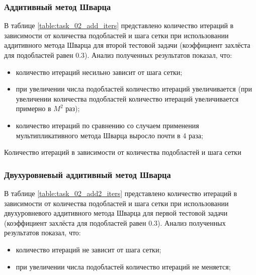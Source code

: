 \documentclass[a4paper]{article}
\begin{document}
\newpage

\subsubsection{Аддитивный метод Шварца}

В таблице \ref{table:task_02_add_iters} представлено количество итераций в зависимости от количества подобластей и шага сетки при использовании аддитивного метода Шварца для второй тестовой задачи (коэффициент захлёста для подобластей равен 0.3). Анализ полученных результатов показал, что:
\begin{itemize}
\item количество итераций несильно зависит от шага сетки;
\item при увеличении числа подобластей количество итераций увеличивается (при увеличении количества подобластей количество итераций увеличивается примерно в $M^2$ раз);
\item количество итераций по сравнению со случаем применения мультипликативного метода Шварца выросло почти в 4 раза;
\end{itemize}

\begin{table}[h]
\caption{Количество итераций в зависимости от количества подобластей и шага сетки}
\label{table:task_02_add_iters}
\end{table}

\newpage

\subsubsection{Двухуровневый аддитивный метод Шварца}

В таблице \ref{table:task_02_add2_iters} представлено количество итераций в зависимости от количества подобластей и шага сетки при использовании двухуровневого аддитивного метода Шварца для первой тестовой задачи (коэффициент захлёста для подобластей равен 0.3). Анализ полученных результатов показал, что:
\begin{itemize}
\item количество итераций не зависит от шага сетки;
\item при увеличении числа подобластей количество итераций не меняется;
\end{itemize}
\end{document}
